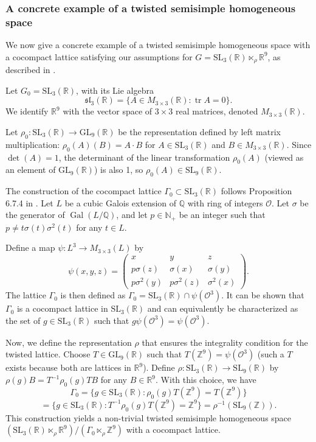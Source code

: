 \documentclass[11pt]{amsart}
\numberwithin{equation}{section}
\newcommand{\R}{\mathbb{R}}
\theoremstyle{plain}
\begin{document}
\subsubsection{A concrete example of a twisted semisimple homogeneous space}\label{extwcf}
We now give a concrete example of a twisted semisimple homogeneous space with a cocompact lattice satisfying our assumptions for $G = \mathrm{SL}_3(\mathbb{R}) \ltimes_\rho \mathbb{R}^9$, as described in \cite{Witte}.

Let $G_0 = \mathrm{SL}_3(\mathbb{R})$, with its Lie algebra
\[
\mathfrak{sl}_3(\mathbb{R}) = \{ A \in M_{3 \times 3}(\mathbb{R}) : \operatorname{tr} A = 0 \}.
\]
We identify $\mathbb{R}^9$ with the vector space of $3 \times 3$ real matrices, denoted $M_{3 \times 3}(\mathbb{R})$.

Let $\rho_0: \mathrm{SL}_3(\mathbb{R}) \to \mathrm{GL}_9(\mathbb{R})$ be the representation defined by left matrix multiplication: $\rho_0(A)(B) = A \cdot B$ for $A \in \mathrm{SL}_3(\mathbb{R})$ and $B \in M_{3 \times 3}(\mathbb{R})$. Since $\det(A)=1$, the determinant of the linear transformation $\rho_0(A)$ (viewed as an element of $\mathrm{GL}_9(\mathbb{R})$) is also 1, so $\rho_0(A) \in \mathrm{SL}_9(\mathbb{R})$.

The construction of the cocompact lattice $\Gamma_0 \subset \mathrm{SL}_3(\mathbb{R})$ follows Proposition 6.7.4 in \cite{Wittebook}. Let $L$ be a cubic Galois extension of $\mathbb{Q}$ with ring of integers $\mathcal{O}$. Let $\sigma$ be the generator of $\operatorname{Gal}(L/\mathbb{Q})$, and let $p \in \mathbb{N}_+$ be an integer such that $p \neq t \sigma(t) \sigma^2(t)$ for any $t \in L$.

Define a map $\psi: L^3 \to M_{3 \times 3}(L)$ by
\[
\psi(x,y,z) = \begin{pmatrix}
     x & y & z \\
     p\sigma(z) & \sigma(x) & \sigma(y) \\
     p\sigma^2(y) & p\sigma^2(z) & \sigma^2(x)
 \end{pmatrix}.
\]
The lattice $\Gamma_0$ is then defined as $\Gamma_0=\mathrm{SL}_3(\mathbb{R}) \cap \psi(\mathcal{O}^3)$. It can be shown that $\Gamma_0$ is a cocompact lattice in $\mathrm{SL}_3(\mathbb{R})$ and can equivalently be characterized as the set of $g \in \mathrm{SL}_3(\mathbb{R})$ such that $g \psi(\mathcal{O}^3) = \psi(\mathcal{O}^3)$.

Now, we define the representation $\rho$ that ensures the integrality condition for the twisted lattice. Choose $T \in \mathrm{GL}_9(\mathbb{R})$ such that $T(\mathbb{Z}^9) = \psi(\mathcal{O}^3)$ (such a $T$ exists because both are lattices in $\R^9$). Define $\rho: \mathrm{SL}_3(\mathbb{R}) \to \mathrm{SL}_9(\mathbb{R})$ by $\rho(g)B = T^{-1} \rho_0(g) T B$ for any $B \in \mathbb{R}^9$. With this choice, we have
\[
\Gamma_0 = \{ g \in \mathrm{SL}_3(\mathbb{R}) : \rho_0(g) T(\mathbb{Z}^9) = T(\mathbb{Z}^9) \} \]\[= \{ g \in \mathrm{SL}_3(\mathbb{R}) : T^{-1} \rho_0(g) T (\mathbb{Z}^9) = \mathbb{Z}^9 \} = \rho^{-1}(\mathrm{SL}_9(\mathbb{Z})).
\]
This construction yields a non-trivial twisted semisimple homogeneous space $(\mathrm{SL}_3(\mathbb{R}) \ltimes_\rho \mathbb{R}^9) / (\Gamma_0 \ltimes_\rho \mathbb{Z}^9)$ with a cocompact lattice.
\end{document}
